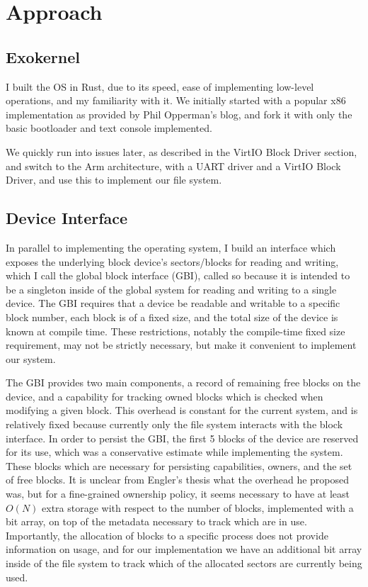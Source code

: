\documentclass[letterpaper,twocolumn,10pt]{article}
\begin{document}
\section{Approach}

\subsection{Exokernel}

I built the OS in Rust, due to its speed, ease of implementing low-level operations, and my
familiarity with it. We initially started with a popular x86 implementation as provided by Phil
Opperman's blog, and fork it with only the basic bootloader and text console implemented.

We quickly run into issues later, as described in the VirtIO Block Driver section, and switch to
the Arm architecture, with a UART driver and a VirtIO Block Driver, and use this to implement
our file system.

\subsection{Device Interface}\label{sec:gbi}

In parallel to implementing the operating system, I build an interface which exposes the
underlying block device's sectors/blocks for reading and writing, which I call the global block
interface (GBI), called so because it is intended to be a singleton inside of the global system
for reading and writing to a single device. The GBI requires that a device be readable and
writable to a specific block number, each block is of a fixed size, and the total size of the
device is known at compile time. These restrictions, notably the compile-time fixed size
requirement, may not be strictly necessary, but make it convenient to implement our system.

The GBI provides two main components, a record of remaining free blocks on the device, and a
capability for tracking owned blocks which is checked when modifying a given block. This
overhead is constant for the current system, and is relatively fixed because currently only the
file system interacts with the block interface. In order to persist the GBI, the first 5 blocks
of the device are reserved for its use, which was a conservative estimate while implementing the
system. These blocks which are necessary for persisting capabilities, owners, and the set of
free blocks. It is unclear from Engler's thesis what the overhead he proposed was, but for a
fine-grained ownership policy, it seems necessary to have at least $O(N)$ extra storage with
respect to the number of blocks, implemented with a bit array, on top of the metadata necessary
to track which are in use. Importantly, the allocation of blocks to a specific process does not
provide information on usage, and for our implementation we have an additional bit array inside
of the file system to track which of the allocated sectors are currently being used.
\end{document}
